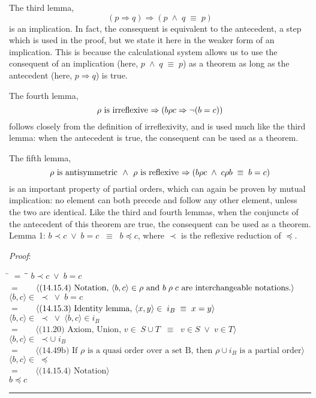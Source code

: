 \documentclass[12pt, fleqn, leqno]{article}
\newcommand{\lgap}{2pt}                             %
\newcommand{\mymathindent}{24pt}                    %
\newcommand{\equivs}{\ensuremath{\;\equiv\;}}       %
\newcommand{\equivss}{\ensuremath{\;\;\equiv\;\;}}  %
\newcommand{\lors}{\ensuremath{\;\lor\;}}           %
\newcommand{\lands}{\ensuremath{\;\land\;}}         %
\newcommand{\impl}{\ensuremath{\Rightarrow}}        %
\newcommand{\myqed}{\rule[-.23ex]{1.2ex}{2.0ex}}
\newcommand{\myqedtab}{\hspace{384pt}}              %
\newcommand{\Gll} {\langle}                         %
\newcommand{\Ggg} {\rangle}                         %
\newcommand{\Hint}[1]     {\ \ \ $\Gll              \mbox{#1} \Ggg$ }   %
\begin{document}
The third lemma,
\[
(p \impl q) \impl (p \lands q \equivs p)
\]is an implication.
In fact, the consequent is equivalent to the antecedent, a step which is used in the proof, but we state it here in the weaker form of an implication.
This is because the calculational system allows us to use the consequent of an implication (here, $p \lands q \equivs p$) as a theorem as long as the antecedent (here, $p \impl q$) is true.

The fourth lemma,
\[\rho$ is irreflexive $\impl (b \rho c \impl \lnot (b = c))
\]
follows closely from the definition of irreflexivity, and is used much like the third lemma: when the antecedent is true, the consequent can be used as a theorem.

The fifth lemma,
\[
\rho$ is antisymmetric $\lands$ $\rho$ is reflexive $\impl (b \rho c \lands c \rho b \equivs b = c)
\]
is an important property of partial orders, which can again be proven by mutual implication: no element can both precede and follow any other element, unless the two are identical.
Like the third and fourth lemmas, when the conjuncts of the antecedent of this theorem are true, the consequent can be used as a theorem.\\

Lemma 1: $b \prec c \lors b = c \equivss b \preceq c$, where $\prec$ is the reflexive reduction of $\preceq$.

\textit{Proof}:
\begin{tabbing}
\hspace{\mymathindent} \= $= \;$ \= \myqedtab \= \kill
	\> \>  $b \prec c \lors b = c$\\
	\> $=$  \>  \Hint{(14.15.4) Notation, $ \langle b, c \rangle \in \rho$ and $b \; \rho \; c$ are interchangeable notations.}\\[\lgap]
	\> \>   $ \langle b, c \rangle \in\; \prec \lors b = c$\\
	\> $=$  \>  \Hint{(14.15.3) Identity lemma, $ \langle x, y \rangle \in\; i_B \equivs x = y$}\\[\lgap]
	\> \>   $ \langle b, c \rangle \in\; \prec \lors \langle b, c \rangle \in i_B$\\
	\> $=$  \>  \Hint{(11.20) Axiom, Union, $v \in\; S \cup T \equivss v \in S \lors v \in T$}\\[\lgap]
	\> \>   $ \langle b, c \rangle \in\; \prec \cup\; i_B$\\
	\> $=$  \>  \Hint{(14.49b) If $\rho$ is a quasi order over a set B, then $\rho \cup i_B$ is a partial order}\\[\lgap]
	\> \>   $ \langle b, c \rangle \in\; \preceq$\\
	\> $=$  \>  \Hint{(14.15.4) Notation}\\[\lgap]
	\> \>   $b \preceq c$\quad \myqed\\
\end{tabbing}
\end{document}

